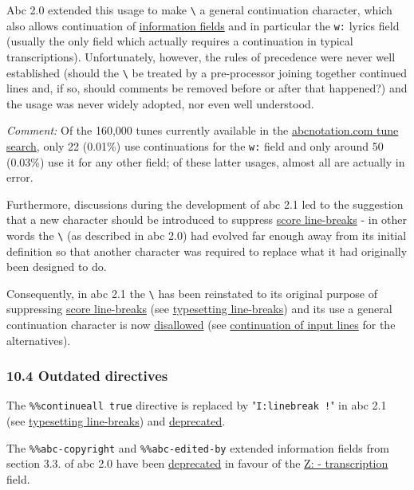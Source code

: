 \documentclass[oneside]{book}
\begin{document}
Abc 2.0 extended this usage to make \texttt{\textbackslash{}} a general
continuation character, which also allows continuation of
\protect\hyperlink{information_field_definition}{information fields} and
in particular the \texttt{w:} lyrics field (usually the only field which
actually requires a continuation in typical transcriptions).
Unfortunately, however, the rules of precedence were never well
established (should the \texttt{\textbackslash{}} be treated by a
pre-processor joining together continued lines and, if so, should
comments be removed before or after that happened?) and the usage was
never widely adopted, nor even well understood.

\emph{Comment:} Of the 160,000 tunes currently available in the
\href{http://abcnotation.com/search}{abcnotation.com tune search}, only
22 (0.01\%) use continuations for the \texttt{w:} field and only around
50 (0.03\%) use it for any other field; of these latter usages, almost
all are actually in error.

Furthermore, discussions during the development of abc 2.1 led to the
suggestion that a new character should be introduced to suppress
\protect\hyperlink{score_line-break_definition}{score line-breaks} - in
other words the \texttt{\textbackslash{}} (as described in abc 2.0) had
evolved far enough away from its initial definition so that another
character was required to replace what it had originally been designed
to do.

Consequently, in abc 2.1 the \texttt{\textbackslash{}} has been
reinstated to its original purpose of suppressing
\protect\hyperlink{score_line-break_definition}{score line-breaks} (see
\protect\hyperlink{typesetting_line-breaks}{typesetting line-breaks})
and its use a general continuation character is now
\protect\hyperlink{outdated_syntax}{disallowed} (see
\protect\hyperlink{continuation_of_input_lines}{continuation of input
lines} for the alternatives).

\hypertarget{outdated_directives}{\subsubsection{10.4 Outdated
directives}\label{outdated_directives}}

The \texttt{\%\%continueall\ true} directive is replaced by
"\texttt{I:linebreak\ !}" in abc 2.1 (see
\protect\hyperlink{typesetting_line-breaks}{typesetting line-breaks})
and \protect\hyperlink{outdated_syntax}{deprecated}.

The \texttt{\%\%abc-copyright} and \texttt{\%\%abc-edited-by} extended
information fields from section 3.3. of abc 2.0 have been
\protect\hyperlink{outdated_syntax}{deprecated} in favour of the
\protect\hyperlink{ztranscription}{Z: - transcription} field.
\end{document}
